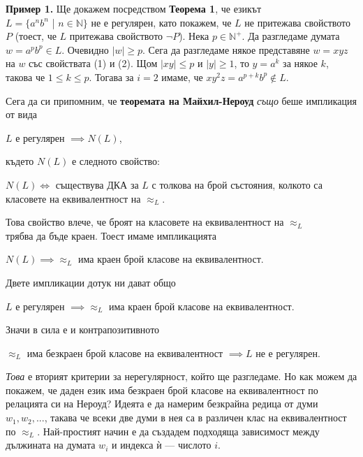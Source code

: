 \documentclass[openany]{book}
\begin{document}
    \vspace{15pt}

    \textbf{Пример 1.} Ще докажем посредством \textbf{Теорема 1}, че езикът \\
    $L = \{a^nb^n$ | $n \in \mathbb{N}\}$ не е регулярен, като покажем, че $L$ не
    притежава свойството $P$ (тоест, че $L$ притежава свойството $\neg P$). Нека $p \in \mathbb{N^+}$. Да разгледаме думата 
    $w = a^pb^p \in L$. Очевидно $|w| \geq p$. Сега да разгледаме някое представяне
    $w = xyz$ на $w$ със свойствата (1) и (2). Щом $|xy| \leq p$ и $|y| \geq 1$, то 
    $y = a^k$ за някое $k$, такова че $1 \leq k \leq p$. Тогава за $i = 2$ имаме, че 
    $xy^2z = a^{p+k}b^p \notin L$. 

    \vspace{15pt}

    \hspace{15pt} Сега да си припомним, че \textbf{теоремата на Майхил-Нероуд} 
    \textit{също} беше импликация от вида 
    \begin{center}
        $L$ е регулярен $\implies N(L)$,
    \end{center}
    където $N(L)$ е следното свойство:
    \begin{center}
        $N(L) \iff$ съществува ДКА за $L$ с толкова на брой състояния, колкото са 
        класовете на еквивалентност на $\approx_L$.
    \end{center}
    Това свойство влече, че броят на класовете на еквивалентност на $\approx_L$ \\
    трябва да бъде краен. Тоест имаме импликацията
    \begin{center}
        $N(L) \implies \approx_L$ има краен брой класове на еквивалентност. 
    \end{center}
    Двете импликации дотук ни дават общо
    \begin{center}
        $L$ е регулярен $\implies \approx_L$ има краен брой класове на еквивалентност.
    \end{center}
    Значи в сила е и контрапозитивното
    \begin{center}
        $\approx_L$ има безкраен брой класове на еквивалентност $\implies L$ не е регулярен.
    \end{center}
    \textit{Това} е вторият критерии за нерегулярност, който ще разгледаме.
    Но как можем да покажем, че даден език има безкраен брой класове на еквивалентност
    по релацията си на Нероуд? Идеята е да намерим безкрайна редица от думи 
    $w_1,w_2,...$, такава че всеки две думи в нея са в различен клас на еквивалентност
    по $\approx_L$. Най-простият начин е да създадем подходяща зависимост между дължината
    на думата $w_i$ и индекса ѝ — числото $i$.
\end{document}

